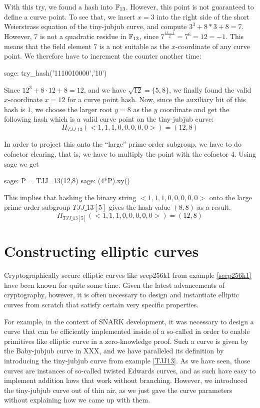 \begin{example}
With this try, we found a hash into $\mathbb{F}_{13}$. However, this point is not guaranteed to define a curve point. To see that, we insert $x=3$ into the right side of the short Weierstrass equation of the tiny-jubjub curve, and compute $3^3 + 8*3 + 8 = 7$. However, $7$ is not a quadratic residue in $\mathbb{F}_{13}$, since $7^{\frac{13-1}{2}}=7^6=12=-1$. This means that the field element $7$ is a not suitable as the $x$-coordinate of any curve point. We therefore have to increment the counter another time: 
\begin{sagecommandline}
sage: try_hash('1110010000','10')
\end{sagecommandline}
Since $12^3 + 8\cdot 12 + 8 = 12$, and we have $\sqrt{12} = \{5, 8\}$, we finally found the valid $x$-coordinate $x=12$ for a curve point hash. Now, since the auxiliary bit of this hash is $1$, we choose the larger root $y=8$ as the $y$ coordinate and get the following hash which is a valid curve point on the tiny-jubjub curve:
$$
H_{TJJ\_13}(<1,1,1,0,0,0,0,0>) = (12,8)
$$

In order to project this onto the ``large'' prime-order subgroup, we have to do cofactor clearing, that is, we have to multiply the point with the cofactor $4$. Using sage we get
\begin{sagecommandline}
sage: P = TJJ_13(12,8)
sage: (4*P).xy()
\end{sagecommandline}

This implies that hashing the binary string $<1,1,1,0,0,0,0,0>$ onto the large prime order subgroup $TJJ\_13[5]$ gives the hash value $(8,8)$ as a result. 
$$
H_{TJJ\_13[5]}(<1,1,1,0,0,0,0,0>) = (12,8)
$$
\end{example}

\section{Constructing elliptic curves} Cryptographically secure elliptic curves like secp256k1 from example \ref{secp256k1} have been known for quite some time. Given the latest advancements of cryptography, however, it is often necessary to design and instantiate elliptic curves from scratch that satisfy certain very specific properties. 

For example, in the context of SNARK development, it was necessary to design a curve that can be efficiently implemented inside of a so-called  in order to enable primitives like elliptic curve  in a zero-knowledge proof. Such a curve is given by the Baby-jubjub curve in XXX, and we have paralleled its definition by introducing the tiny-jubjub curve from example \ref{TJJ13}. As we have seen, those curves are instances of so-called twisted Edwards curves, and as such have easy to implement addition laws that work without branching. However, we introduced the tiny-jubjub curve out of thin air, as we just gave the curve parameters without explaining how we came up with them.

